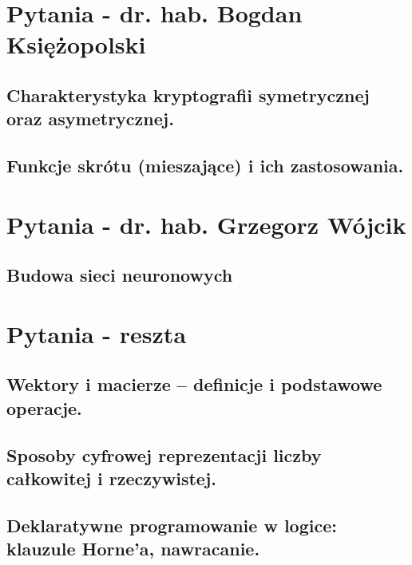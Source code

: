 \documentclass[a4paper,12pt,oneside]{book}
\begin{document}
	\tableofcontents

	\chapter*{Pytania - dr. hab. Bogdan Księżopolski}
		
		\setcounter{section}{65}
		\section{Charakterystyka kryptografii symetrycznej oraz asymetrycznej.}
		
		
		\setcounter{section}{1}
		\section{Funkcje skrótu (mieszające) i ich zastosowania. }
		
	
	\chapter*{Pytania - dr. hab. Grzegorz Wójcik}
		
		\setcounter{section}{32}
		\section{Budowa sieci neuronowych}
	
	\chapter*{Pytania - reszta}
		
		\setcounter{section}{0}
		\section{Wektory i macierze – definicje i podstawowe operacje.}
		
		\setcounter{section}{5}
		\section{Sposoby cyfrowej reprezentacji liczby całkowitej i rzeczywistej.}
		
		\setcounter{section}{52}
		\section{Deklaratywne programowanie w logice: klauzule Horne'a, nawracanie.}
	
\end{document}

